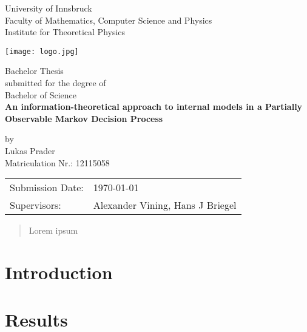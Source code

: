 \documentclass[a4paper,DIV=13,11pt,UKenglish,titlepage=firstiscover,abstract=on]{scrreprt}
\begin{document}
\def\findate{\today}


\thispagestyle{empty}
\begin{center}
    \Large{University of Innsbruck \\ Faculty of Mathematics, Computer Science and Physics} \\
    \vspace{3mm}
    \large{Institute for Theoretical Physics}
    \vspace{10mm}

    \texttt{[image: logo.jpg]}

    \vspace{10mm}
    \Large{Bachelor Thesis} \\
    \large{submitted for the degree of} \\
    \Large{Bachelor of Science} \\
    \vspace{10mm}
    \LARGE{\textbf{An information-theoretical approach to internal models in a Partially Observable Markov Decision Process}} \\
    \vspace{10mm}

    \large{by \\ Lukas Prader \\ Matriculation Nr.: 12115058}
\end{center}

\vspace{30mm}
\begin{tabular}{ll}
    \large{Submission Date:} & \large{\findate}                          \\
    \large{Supervisors:}     & \large{Alexander Vining, Hans J  Briegel} \\
\end{tabular}


\newpage
\thispagestyle{empty}
\begin{abstract}
    Lorem ipsum
\end{abstract}


\tableofcontents

\clearpage
{}

\chapter{Introduction} \label{chap:introduction}


\chapter{Results} \label{chap:results}
\end{document}
